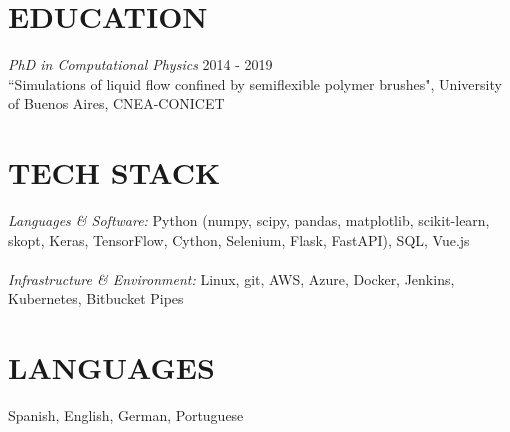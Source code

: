 \documentclass[margin]{res}
\begin{document}
\begin{resume}

\section{EDUCATION} {\sl PhD in Computational Physics}  \hfill 2014 - 2019 \\
                ``Simulations of liquid flow confined by semiflexible 
		polymer brushes", University of Buenos Aires, CNEA-CONICET  \\

 
    \section{TECH STACK} {\sl Languages \& Software:} Python (numpy, scipy, pandas, matplotlib, scikit-learn, skopt, Keras, TensorFlow, Cython, Selenium, Flask, FastAPI), SQL, Vue.js \\ \\ 
    {\sl Infrastructure \& Environment:} Linux, git, AWS, Azure, Docker, Jenkins, Kubernetes, Bitbucket Pipes \\
               
 
\section{LANGUAGES}  Spanish, English, German, Portuguese 

 

\end{resume}
\end{document}
